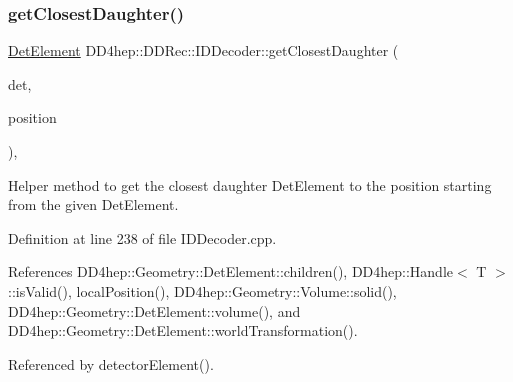 \hypertarget{class_d_d4hep_1_1_d_d_rec_1_1_i_d_decoder_a7ff69a5376066763ee49fdf228a362b3}{}\label{class_d_d4hep_1_1_d_d_rec_1_1_i_d_decoder_a7ff69a5376066763ee49fdf228a362b3} 
\subsubsection{\texorpdfstring{get\+Closest\+Daughter()}{getClosestDaughter()}}
{\footnotesize\ttfamily \hyperlink{class_d_d4hep_1_1_geometry_1_1_det_element}{Det\+Element} D\+D4hep\+::\+D\+D\+Rec\+::\+I\+D\+Decoder\+::get\+Closest\+Daughter (\begin{DoxyParamCaption}\item[{const \hyperlink{class_d_d4hep_1_1_geometry_1_1_det_element}{Geometry\+::\+Det\+Element} \&}]{det,  }\item[{const \hyperlink{namespace_d_d4hep_1_1_geometry_a55083902099d03506c6db01b80404900}{Geometry\+::\+Position} \&}]{position }\end{DoxyParamCaption})\hspace{0.3cm}{\ttfamily [static]}, {\ttfamily [protected]}}



Helper method to get the closest daughter Det\+Element to the position starting from the given Det\+Element. 



Definition at line 238 of file I\+D\+Decoder.\+cpp.



References D\+D4hep\+::\+Geometry\+::\+Det\+Element\+::children(), D\+D4hep\+::\+Handle$<$ T $>$\+::is\+Valid(), local\+Position(), D\+D4hep\+::\+Geometry\+::\+Volume\+::solid(), D\+D4hep\+::\+Geometry\+::\+Det\+Element\+::volume(), and D\+D4hep\+::\+Geometry\+::\+Det\+Element\+::world\+Transformation().



Referenced by detector\+Element().

\hypertarget{class_d_d4hep_1_1_d_d_rec_1_1_i_d_decoder_a9a7ec8c15a97dad8bdbc0743bb534c3f}{}\label{class_d_d4hep_1_1_d_d_rec_1_1_i_d_decoder_a9a7ec8c15a97dad8bdbc0743bb534c3f} 
